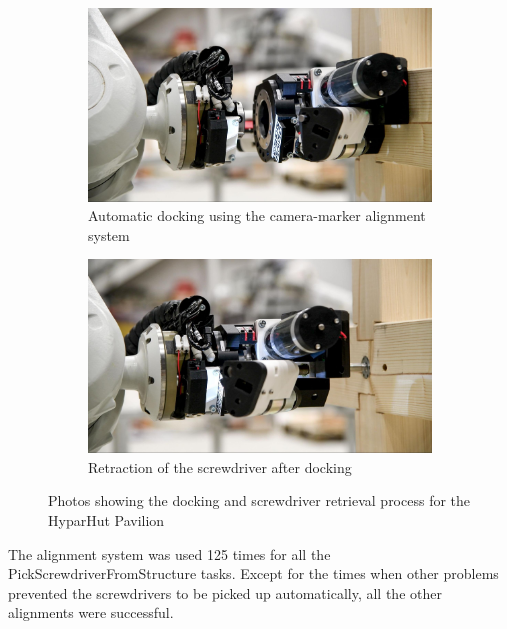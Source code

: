 \begin{figure}[!h]
    \centering
    \begin{subfigure}[b]{0.49\textwidth}
        \centering
        \includegraphics[width=\textwidth]{images/7b/img41.jpg}
        \caption{Automatic docking using the camera-marker alignment system}
    \end{subfigure}
    \hfill
    \begin{subfigure}[b]{0.49\textwidth}
        \centering
        \includegraphics[width=\textwidth]{images/7b/img42.jpg}
        \caption{Retraction of the screwdriver after docking}
    \end{subfigure}
    \caption{Photos showing the docking and screwdriver retrieval process for the HyparHut Pavilion}
    \label{fig:docking-and-screwdriver-retrieval-process}
\end{figure}

The alignment system was used 125 times for all the PickScrewdriverFromStructure tasks. Except for the times when other problems prevented the screwdrivers to be picked up automatically, all the other alignments were successful.

